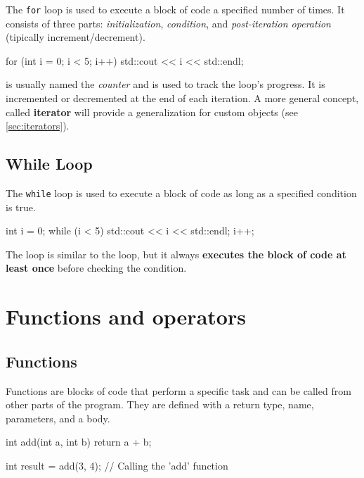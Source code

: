 The \texttt{for} loop is used to execute a block of code a specified number of times. It consists of three parts: \textit{initialization}, \textit{condition}, and \textit{post-iteration operation} (tipically increment/decrement).

\begin{codeblock}[language=C++]
for (int i = 0; i < 5; i++) {
    std::cout << i << std::endl;
}
\end{codeblock}

\begin{observationblock}[Counter]
     is usually named the \textit{counter} and is used to track the loop's progress. It is incremented or decremented at the end of each iteration. A more general concept, called \textbf{iterator} will provide a generalization for custom objects (see \cref{sec:iterators}).
\end{observationblock}

\subsection{While Loop}

The \texttt{while} loop is used to execute a block of code as long as a specified condition is true.

\begin{codeblock}[language=C++]
int i = 0;
while (i < 5) {
    std::cout << i << std::endl;
    i++;
}
\end{codeblock}

\begin{tipsblock}[Do-While]
    The  loop is similar to the  loop, but it always \textbf{executes the block of code at least once} before checking the condition.
\end{tipsblock}

\section{Functions and operators}

\subsection{Functions}

Functions are blocks of code that perform a specific task and can be called from other parts of the program. They are defined with a return type, name, parameters, and a body.

\begin{codeblock}[language=C++, numbers = none]
int add(int a, int b) {
    return a + b;
}

int result = add(3, 4); // Calling the 'add' function
\end{codeblock}

